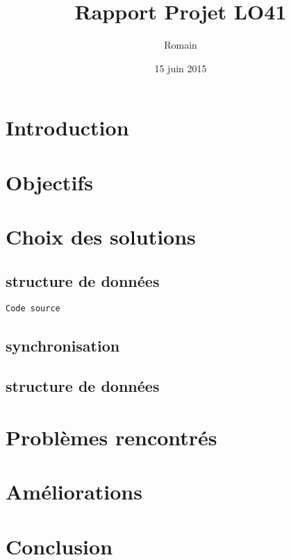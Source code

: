 \documentclass{report}
\title{Rapport Projet LO41}
\author{Romain \bsc{Dulieu}}
\date{15 juin 2015}
\begin{document}
\maketitle

\chapter{Introduction}

\chapter{Objectifs}

\chapter{Choix des solutions}

\section{structure de données}
\begin{lstlisting}
Code source
\end{lstlisting}
\section{synchronisation}

\section{structure de données}

\chapter{Problèmes rencontrés}

\chapter{Améliorations}

\chapter{Conclusion}



\end{document}
